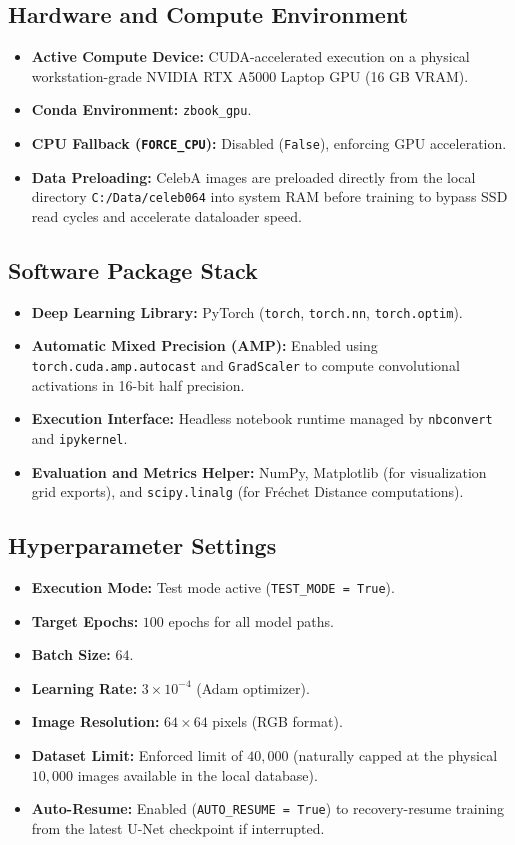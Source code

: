 \documentclass[11pt,a4paper]{article}
\begin{document}
\subsection{Hardware and Compute Environment}
\begin{itemize}
    \item \textbf{Active Compute Device:} CUDA-accelerated execution on a physical workstation-grade NVIDIA RTX A5000 Laptop GPU (16 GB VRAM).
    \item \textbf{Conda Environment:} \texttt{zbook\_gpu}.
    \item \textbf{CPU Fallback (\texttt{FORCE\_CPU}):} Disabled (\texttt{False}), enforcing GPU acceleration.
    \item \textbf{Data Preloading:} CelebA images are preloaded directly from the local directory \texttt{C:/Data/celeb064} into system RAM before training to bypass SSD read cycles and accelerate dataloader speed.
\end{itemize}

\subsection{Software Package Stack}
\begin{itemize}
    \item \textbf{Deep Learning Library:} PyTorch (\texttt{torch}, \texttt{torch.nn}, \texttt{torch.optim}).
    \item \textbf{Automatic Mixed Precision (AMP):} Enabled using \texttt{torch.cuda.amp.autocast} and \texttt{GradScaler} to compute convolutional activations in 16-bit half precision.
    \item \textbf{Execution Interface:} Headless notebook runtime managed by \texttt{nbconvert} and \texttt{ipykernel}.
    \item \textbf{Evaluation and Metrics Helper:} NumPy, Matplotlib (for visualization grid exports), and \texttt{scipy.linalg} (for Fr\'echet Distance computations).
\end{itemize}

\subsection{Hyperparameter Settings}
\begin{itemize}
    \item \textbf{Execution Mode:} Test mode active (\texttt{TEST\_MODE = True}).
    \item \textbf{Target Epochs:} $100$ epochs for all model paths.
    \item \textbf{Batch Size:} $64$.
    \item \textbf{Learning Rate:} $3 \times 10^{-4}$ (Adam optimizer).
    \item \textbf{Image Resolution:} $64 \times 64$ pixels (RGB format).
    \item \textbf{Dataset Limit:} Enforced limit of $40,000$ (naturally capped at the physical $10,000$ images available in the local database).
    \item \textbf{Auto-Resume:} Enabled (\texttt{AUTO\_RESUME = True}) to recovery-resume training from the latest U-Net checkpoint if interrupted.
\end{itemize}
\end{document}
